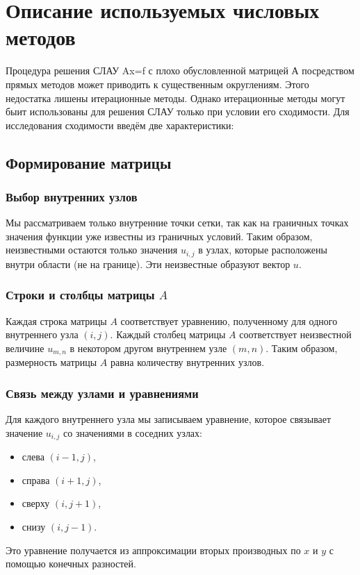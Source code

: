 \documentclass[a4paper, fleqn]{report}
\begin{document}
\chapter*{Описание используемых числовых методов}
Процедура решения СЛАУ Ax=f с плохо обусловленной матрицей А посредством прямых методов может приводить к существенным округлениям. Этого недостатка лишены итерационные методы. Однако итерационные методы могут быит использованы для решения СЛАУ только при условии его сходимости. Для исследования сходимости введём две характеристики:

\section*{Формирование матрицы}

\subsection*{Выбор внутренних узлов}
Мы рассматриваем только внутренние точки сетки, так как на граничных точках значения функции уже известны из граничных условий. Таким образом, неизвестными остаются только значения $u_{i,j}$ в узлах, которые расположены внутри области (не на границе). Эти неизвестные образуют вектор $u$.

\subsection*{Строки и столбцы матрицы $A$}
Каждая строка матрицы $A$ соответствует уравнению, полученному для одного внутреннего узла $(i,j)$.  
Каждый столбец матрицы $A$ соответствует неизвестной величине $u_{m,n}$ в некотором другом внутреннем узле $(m,n)$.  
Таким образом, размерность матрицы $A$ равна количеству внутренних узлов.

\subsection*{Связь между узлами и уравнениями}
Для каждого внутреннего узла мы записываем уравнение, которое связывает значение $u_{i,j}$ со значениями в соседних узлах:
\begin{itemize}
    \item слева $(i-1,j)$,
    \item справа $(i+1,j)$,
    \item сверху $(i,j+1)$,
    \item снизу $(i,j-1)$.
\end{itemize}
Это уравнение получается из аппроксимации вторых производных по $x$ и $y$ с помощью конечных разностей.
\end{document}
